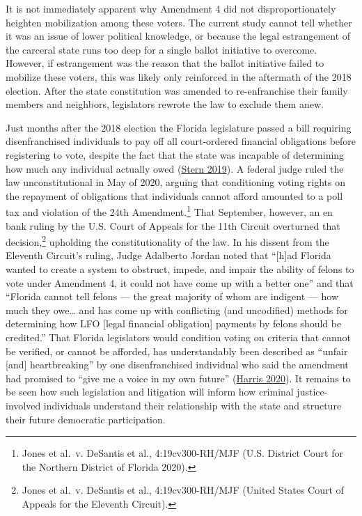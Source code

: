 \documentclass[
  12pt,
]{article}
\begin{document}
It is not immediately apparent why Amendment 4 did not disproportionately heighten mobilization among these voters. The current study cannot tell whether it was an issue of lower political knowledge, or because the legal estrangement of the carceral state runs too deep for a single ballot initiative to overcome. However, if estrangement was the reason that the ballot initiative failed to mobilize these voters, this was likely only reinforced in the aftermath of the 2018 election. After the state constitution was amended to re-enfranchise their family members and neighbors, legislators rewrote the law to exclude them anew.

Just months after the 2018 election the Florida legislature passed a bill requiring disenfranchised individuals to pay off all court-ordered financial obligations before registering to vote, despite the fact that the state was incapable of determining how much any individual actually owed (\protect\hyperlink{ref-Stern2019}{Stern 2019}). A federal judge ruled the law unconstitutional in May of 2020, arguing that conditioning voting rights on the repayment of obligations that individuals cannot afford amounted to a poll tax and violation of the 24th Amendment.\footnote{Jones et al.~v. DeSantis et al., 4:19cv300-RH/MJF (U.S. District Court for the Northern District of Florida 2020).} That September, however, an en bank ruling by the U.S. Court of Appeals for the 11th Circuit overturned that decision,\footnote{Jones et al.~v. DeSantis et al., 4:19cv300-RH/MJF (United States Court of Appeals for the Eleventh Circuit).} upholding the constitutionality of the law. In his dissent from the Eleventh Circuit's ruling, Judge Adalberto Jordan noted that ``{[}h{]}ad Florida wanted to create a system to obstruct, impede, and impair the ability of felons to vote under Amendment 4, it could not have come up with a better one'' and that ``Florida cannot tell felons --- the great majority of whom are indigent --- how much they owe\ldots{} and has come up with conflicting (and uncodified) methods for determining how LFO {[}legal financial obligation{]} payments by felons should be credited.'' That Florida legislators would condition voting on criteria that cannot be verified, or cannot be afforded, has understandably been described as ``unfair {[}and{]} heartbreaking'' by one disenfranchised individual who said the amendment had promised to ``give me a voice in my own future'' (\protect\hyperlink{ref-Harris2020}{Harris 2020}). It remains to be seen how such legislation and litigation will inform how criminal justice-involved individuals understand their relationship with the state and structure their future democratic participation.
\end{document}
